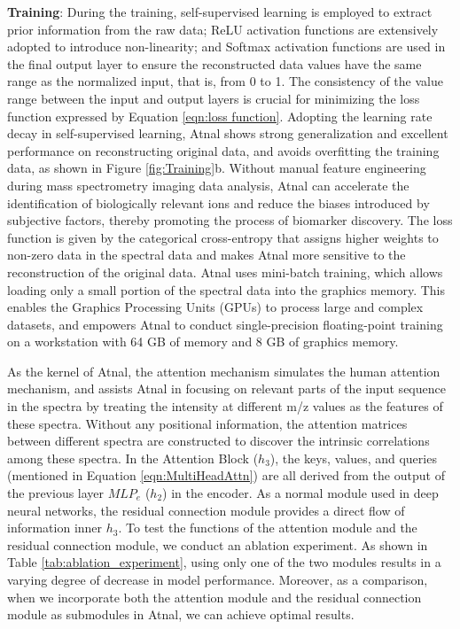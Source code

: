 \documentclass{WileyMSP-template}
\begin{document}
\textbf{Training}: During the training, self-supervised learning is employed to extract prior 
information from the raw data; 
ReLU activation functions are extensively 
adopted to introduce non-linearity; and Softmax 
activation functions are used  in the final output layer to 
ensure the reconstructed data values have the same range as the  
normalized input, that is, from 0 to 1. 
The consistency of the value range between the input and output layers is 
crucial for minimizing the loss function expressed 
by Equation \ref{eqn:loss function}. 
Adopting the learning rate decay in self-supervised learning,
Atnal shows strong generalization and excellent performance on 
reconstructing original data, and avoids overfitting
the training data, as shown in Figure \ref{fig:Training}b. 
Without manual feature 
engineering during mass spectrometry 
imaging data analysis, Atnal can accelerate the identification of 
biologically relevant ions and reduce the biases introduced 
by subjective factors, thereby promoting the process of 
biomarker discovery. 
The loss function is given by 
the categorical cross-entropy that assigns higher weights 
to non-zero data in the spectral data 
and makes Atnal more sensitive to the reconstruction of the original data. 
Atnal uses mini-batch training, which allows 
loading only a small portion of the spectral 
data into the graphics memory. This enables the Graphics Processing Units (GPUs) to process
large and complex datasets, and empowers Atnal to 
conduct single-precision floating-point training on a workstation 
with 64 GB of memory and 8 GB of graphics memory. 


As the kernel of Atnal, the attention mechanism simulates the human 
attention mechanism, and assists Atnal in focusing on 
relevant parts of the input sequence 
in the spectra by treating 
the intensity  
at different m/z values as the features of these spectra. Without any 
positional information, the attention 
matrices between different spectra are  constructed  to discover the 
intrinsic correlations among these spectra. 
In the Attention Block ($h_3$), the keys, values, and queries (mentioned 
in Equation \ref{eqn:MultiHeadAttn}) are all derived 
from the output of the previous layer $MLP_e$ ($h_2$) in the encoder. 
As a normal module used in deep neural networks, the residual connection module 
provides a direct flow of information inner $h_3$. 
To test the functions of the 
attention module and the residual connection module, 
we conduct an ablation experiment. 
As shown in Table \ref{tab:ablation_experiment}, 
using only one of the two modules results in a varying degree of 
decrease in model performance. 
Moreover, as a comparison, when we incorporate both the attention module and the 
residual connection module as submodules in Atnal, we can 
achieve optimal results.
\end{document}

